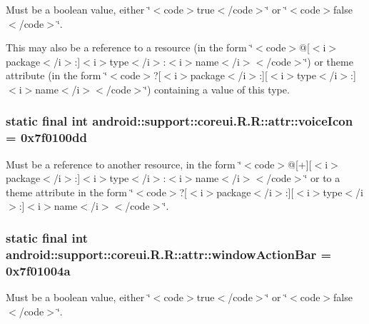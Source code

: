 Must be a boolean value, either \char`\"{}$<$code$>$true$<$/code$>$\char`\"{} or \char`\"{}$<$code$>$false$<$/code$>$\char`\"{}. 

This may also be a reference to a resource (in the form \char`\"{}$<$code$>$@\mbox{[}$<$i$>$package$<$/i$>$:\mbox{]}$<$i$>$type$<$/i$>$:$<$i$>$name$<$/i$>$$<$/code$>$\char`\"{}) or theme attribute (in the form \char`\"{}$<$code$>$?\mbox{[}$<$i$>$package$<$/i$>$:\mbox{]}\mbox{[}$<$i$>$type$<$/i$>$:\mbox{]}$<$i$>$name$<$/i$>$$<$/code$>$\char`\"{}) containing a value of this type. \hypertarget{classandroid_1_1support_1_1coreui_1_1_r_1_1attr_8fd29dc4b35ea7a1e37b1d4fe0639e75}{
\subsubsection[{voiceIcon}]{\setlength{\rightskip}{0pt plus 5cm}static final int android::support::coreui.R.R::attr::voiceIcon = 0x7f0100dd}}
\label{classandroid_1_1support_1_1coreui_1_1_r_1_1attr_8fd29dc4b35ea7a1e37b1d4fe0639e75}


Must be a reference to another resource, in the form \char`\"{}$<$code$>$@\mbox{[}+\mbox{]}\mbox{[}$<$i$>$package$<$/i$>$:\mbox{]}$<$i$>$type$<$/i$>$:$<$i$>$name$<$/i$>$$<$/code$>$\char`\"{} or to a theme attribute in the form \char`\"{}$<$code$>$?\mbox{[}$<$i$>$package$<$/i$>$:\mbox{]}\mbox{[}$<$i$>$type$<$/i$>$:\mbox{]}$<$i$>$name$<$/i$>$$<$/code$>$\char`\"{}. \hypertarget{classandroid_1_1support_1_1coreui_1_1_r_1_1attr_359e4fffe0b3f7a0ad2203f6ca3eaa7c}{
\subsubsection[{windowActionBar}]{\setlength{\rightskip}{0pt plus 5cm}static final int android::support::coreui.R.R::attr::windowActionBar = 0x7f01004a}}
\label{classandroid_1_1support_1_1coreui_1_1_r_1_1attr_359e4fffe0b3f7a0ad2203f6ca3eaa7c}


Must be a boolean value, either \char`\"{}$<$code$>$true$<$/code$>$\char`\"{} or \char`\"{}$<$code$>$false$<$/code$>$\char`\"{}. 

